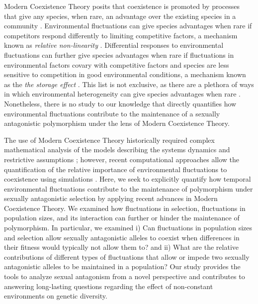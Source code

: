 \begin{refsection}
Modern Coexistence Theory posits that coexistence is promoted by processes that give any species, when rare, an advantage over the existing species in a community \citep{chesson_multispecies_1994,chesson2000mechanisms}. Environmental fluctuations can give species advantages when rare if competitors respond differently to limiting competitive factors, a mechanism known as \textit{relative non-linearity} \citep{chesson2000mechanisms,ellner2016quantify,zepeda2019fluctuation}. Differential responses to environmental fluctuations can further give species advantages when rare if fluctuations in environmental factors covary with competitive factors and species are less sensitive to competition in good environmental conditions, a mechanism known as the \textit{the storage effect} \citep{chesson2000mechanisms,ellner2016quantify,barabas_chessons_2018,schreiber2021positively}. This list is not exclusive, as there are a plethora of ways in which environmental heterogeneity can give species advantages when rare \citep{ellner_expanded_2019}. Nonetheless, there is no study to our knowledge that directly quantifies how environmental fluctuations contribute to the maintenance of a sexually antagonistic polymorphism under the lens of Modern Coexistence Theory.


The use of Modern Coexistence Theory historically required complex mathematical analysis of the models describing the systems dynamics and restrictive assumptions \citep{barabas_chessons_2018}; however, recent computational approaches allow the quantification of the relative importance of environmental fluctuations to coexistence using simulations \citep{ellner2016quantify,ellner_expanded_2019,shoemaker2020}. Here, we seek to explicitly quantify how temporal environmental fluctuations contribute to the maintenance of polymorphism under sexually antagonistic selection by applying recent advances in Modern Coexistence Theory.  We examined how fluctuations in selection, fluctuations in population sizes, and its interaction can further or hinder the maintenance of polymorphism. In particular, we examined i) Can fluctuations in population sizes and selection allow sexually antagonistic alleles to coexist when differences in their fitness would typically not allow them to? and ii) What are the relative contributions of different types of fluctuations that allow or impede two sexually antagonistic alleles to be maintained in a population? Our study provides the tools to analyze sexual antagonism from a novel perspective and contributes to answering long-lasting questions regarding the effect of non-constant environments on genetic diversity.



\end{refsection}
